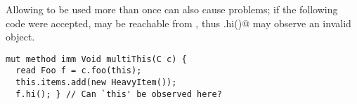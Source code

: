 

Allowing \Q@this@ to be used more than once can also cause problems;
if the following code were accepted, 
\Q@this@ may be reachable from \Q@f@, thus \Q@f.hi()@ may observe an invalid object.
\begin{lstlisting}
mut method imm Void multiThis(C c) {
  read Foo f = c.foo(this);
  this.items.add(new HeavyItem());
  f.hi(); } // Can `this' be observed here?
\end{lstlisting}

